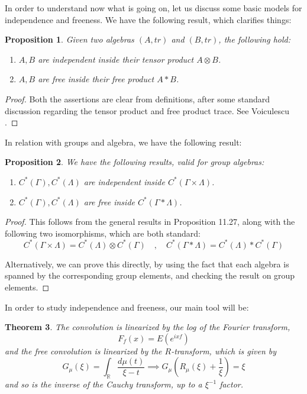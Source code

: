 \documentclass[12pt]{amsbook}
\newtheorem{theorem}{Theorem}[chapter]
\newtheorem{proposition}[theorem]{Proposition}
\begin{document}
\bigskip

In order to understand now what is going on, let us discuss some basic models for independence and freeness. We have the following result, which clarifies things:

\begin{proposition}
Given two algebras $(A,tr)$ and $(B,tr)$, the following hold:
\begin{enumerate}
\item $A,B$ are independent inside their tensor product $A\otimes B$.

\item $A,B$ are free inside their free product $A*B$.
\end{enumerate}
\end{proposition}

\begin{proof}
Both the assertions are clear from definitions, after some standard discussion regarding the tensor product and free product trace. See Voiculescu \cite{vdn}.
\end{proof}

In relation with groups and algebra, we have the following result:

\begin{proposition}
We have the following results, valid for group algebras:
\begin{enumerate}
\item $C^*(\Gamma),C^*(\Lambda)$ are independent inside $C^*(\Gamma\times\Lambda)$.

\item $C^*(\Gamma),C^*(\Lambda)$ are free inside $C^*(\Gamma*\Lambda)$.
\end{enumerate}
\end{proposition}

\begin{proof}
This follows from the general results in Proposition 11.27, along with the following two isomorphisms, which are both standard:
$$C^*(\Gamma\times\Lambda)=C^*(\Lambda)\otimes C^*(\Gamma)\quad,\quad 
C^*(\Gamma*\Lambda)=C^*(\Lambda)*C^*(\Gamma)$$

Alternatively, we can prove this directly, by using the fact that each algebra is spanned by the corresponding group elements, and checking the result on group elements.
\end{proof}

In order to study independence and freeness, our main tool will be: 

\begin{theorem}
The convolution is linearized by the log of the Fourier transform,
$$F_f(x)=E(e^{ixf})$$
and the free convolution is linearized by the $R$-transform, which is given by
$$G_\mu(\xi)=\int_\mathbb R\frac{d\mu(t)}{\xi-t}\implies G_\mu\left(R_\mu(\xi)+\frac{1}{\xi}\right)=\xi$$
and so is the inverse of the Cauchy transform, up to a $\xi^{-1}$ factor.
\end{theorem}
\end{document}
